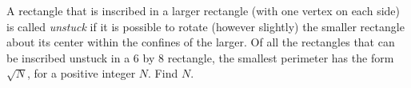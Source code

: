 A rectangle that is inscribed in a larger rectangle (with one vertex on each side) is called \textit{unstuck} if it is possible to rotate (however slightly) the smaller rectangle about its center within the confines of the larger. Of all the rectangles that can be inscribed unstuck in a 6 by 8 rectangle, the smallest perimeter has the form $\sqrt{N}$, for a positive integer $N$. Find $N$.